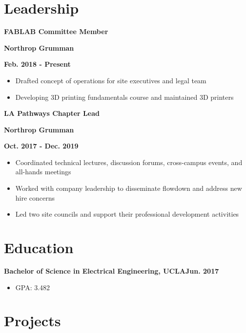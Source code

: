 \documentclass[12pt]{article}
\newcommand\textbox[1]{\parbox{.333\textwidth}{#1}}
\newcommand{\textlcr}[3]{\textbox{\textbf{#1}\hfill}\textbox{\hfil \textbf{#2}\hfil}\textbox{\hfill \textbf{#3}}}
\begin{document}
\section*{Leadership}
\vspace*{-1em}\makebox[\linewidth]{\rule{\textwidth}{0.4pt}}

\textlcr{FABLAB Committee Member}{Northrop Grumman}{Feb. 2018 - Present}
\begin{itemize}
\item Drafted concept of operations for site executives and legal team
\item Developing 3D printing fundamentals course and maintained 3D printers
\end{itemize}

\bigskip
\textlcr{LA Pathways Chapter Lead}{Northrop Grumman}{Oct. 2017 - Dec. 2019}
\begin{itemize}
\item Coordinated technical lectures, discussion forums, cross-campus events, and all-hands meetings
\item Worked with company leadership to disseminate flowdown and address new hire concerns
\item Led two site councils and support their professional development activities
\end{itemize}

\section*{Education}
\vspace*{-1em}\makebox[\linewidth]{\rule{\textwidth}{0.4pt}}

\textbf{Bachelor of Science in Electrical Engineering, UCLA}\hfill\textbf{Jun. 2017}
\begin{itemize}
\item GPA: 3.482
\end{itemize}


\section*{Projects}
\vspace*{-1em}\makebox[\linewidth]{\rule{\textwidth}{0.4pt}}
\end{document}
